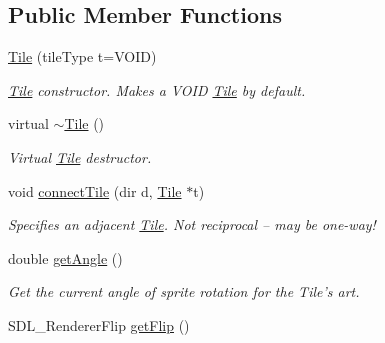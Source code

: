 \subsection*{Public Member Functions}
\begin{DoxyCompactItemize}
\item 
\hyperlink{class_tile_ae8839483d411c1324a0c89327a557194}{Tile} (tile\+Type t=V\+O\+ID)\hypertarget{class_tile_ae8839483d411c1324a0c89327a557194}{}\label{class_tile_ae8839483d411c1324a0c89327a557194}

\begin{DoxyCompactList}\small\item\em \hyperlink{class_tile}{Tile} constructor. Makes a V\+O\+ID \hyperlink{class_tile}{Tile} by default. \end{DoxyCompactList}\item 
virtual \hyperlink{class_tile_a98634abbd93fa13d0578d7103202d03d}{$\sim$\+Tile} ()\hypertarget{class_tile_a98634abbd93fa13d0578d7103202d03d}{}\label{class_tile_a98634abbd93fa13d0578d7103202d03d}

\begin{DoxyCompactList}\small\item\em Virtual \hyperlink{class_tile}{Tile} destructor. \end{DoxyCompactList}\item 
void \hyperlink{class_tile_ab29acce6f4bf7ea4617213269e8c3716}{connect\+Tile} (dir d, \hyperlink{class_tile}{Tile} $\ast$t)\hypertarget{class_tile_ab29acce6f4bf7ea4617213269e8c3716}{}\label{class_tile_ab29acce6f4bf7ea4617213269e8c3716}

\begin{DoxyCompactList}\small\item\em Specifies an adjacent \hyperlink{class_tile}{Tile}. Not reciprocal -- may be one-\/way! \end{DoxyCompactList}\item 
double \hyperlink{class_tile_a947b6692bfcdd7b1adc59fcbee16c1fc}{get\+Angle} ()\hypertarget{class_tile_a947b6692bfcdd7b1adc59fcbee16c1fc}{}\label{class_tile_a947b6692bfcdd7b1adc59fcbee16c1fc}

\begin{DoxyCompactList}\small\item\em Get the current angle of sprite rotation for the Tile’s art. \end{DoxyCompactList}\item 
S\+D\+L\+\_\+\+Renderer\+Flip \hyperlink{class_tile_ad2d2b3bd012d3a54ccb51f6eb986115a}{get\+Flip} ()\hypertarget{class_tile_ad2d2b3bd012d3a54ccb51f6eb986115a}{}\label{class_tile_ad2d2b3bd012d3a54ccb51f6eb986115a}


\end{DoxyCompactItemize}
